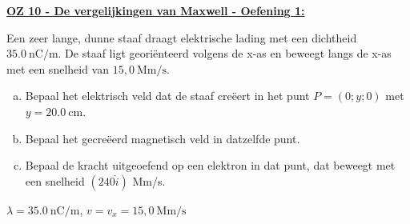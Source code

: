 \textbf{\underline{OZ 10 - De vergelijkingen van Maxwell - Oefening 1:}}
\vspace{0.5cm}

Een zeer lange, dunne staaf draagt elektrische lading met een dichtheid $35.0 \ \text{nC/m}$. De staaf ligt georiënteerd volgens de x-as en beweegt langs de x-as met een snelheid van $15,0 \ \text{Mm/s}$.

\begin{enumerate}[(a)]
    \item Bepaal het elektrisch veld dat de staaf creëert in het punt $P = (0; y; 0)$ met $y = 20.0 \ \text{cm}$.
    \item Bepaal het gecreëerd magnetisch veld in datzelfde punt.
    \item Bepaal de kracht uitgeoefend op een elektron in dat punt, dat beweegt met een snelheid $(240\hat{i})$ Mm/s.
\end{enumerate}

\begin{description}[labelwidth=1.5cm, leftmargin=!]
    \item[Geg. :] $\lambda = 35.0 \ \text{nC/m}$, $v = v_x = 15,0 \ \text{Mm/s}$
\end{description}

